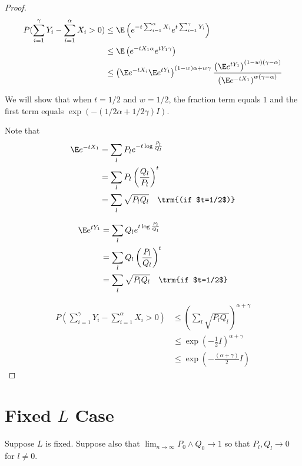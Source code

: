 \documentclass{article}
\begin{document}
\begin{proof}
\begin{align*}
P( \sum_{i=1}^\gamma Y_i - \sum_{i=1}^\alpha X_i > 0 ) &\leq 
  \E \left( e^{- t \sum_{i=1}^\alpha X_i} e^{t \sum_{i=1}^\gamma Y_i} \right) \\
 & \leq  \E \left( e^{ - t X_1 \alpha} e^{ t Y_1 \gamma} \right ) \\
 &\leq \left( \E e^{ - t X_i} \E e^{t Y_1} \right)^{(1-w)\alpha + w \gamma} 
       \frac{ \left( \E e^{t Y_1} \right)^{(1-w)(\gamma - \alpha)} }
            { \left( \E e^{-t X_1} \right)^{w (\gamma - \alpha)} }
\end{align*}

We will show that when $t=1/2$ and $w=1/2$, the fraction term equals $1$ and the first term equals $\exp\left( - (1/2 \alpha + 1/2 \gamma) I \right)$. 

Note that 
\begin{align*}
\E e^{ -t X_1} &= \sum_l P_l e^{ - t \log \frac{P_l}{Q_l}} \\
   &= \sum_l P_l \left( \frac{Q_l}{P_l} \right)^t \\ 
   &= \sum_l \sqrt{P_l Q_l} \quad \trm{(if $t=1/2$)}
\end{align*}

\begin{align*}
\E e^{ t Y_1} &= \sum_l Q_l e^{ t \log \frac{P_l}{Q_l} } \\
   &= \sum_l Q_l \left( \frac{P_l}{Q_l} \right)^t \\
   &= \sum_l \sqrt{P_l Q_l} \quad \trm{if $t=1/2$}
\end{align*}

\begin{align*}
P( \sum_{i=1}^\gamma Y_i - \sum_{i=1}^\alpha X_i > 0) &\leq 
    \left( \sum_l \sqrt{P_lQ_l} \right)^{\alpha + \gamma} \\
   &\leq  \exp( - \frac{1}{2} I)^{\alpha + \gamma} \\
   &\leq \exp\left( - \frac{(\alpha+\gamma)}{2}  I \right)
\end{align*}
   

\end{proof}





\section{Fixed $L$ Case}

Suppose $L$ is fixed. Suppose also that $\lim_{n\rightarrow \infty} P_0 \wedge Q_0 \rightarrow 1$ so that $P_l, Q_l \rightarrow 0$ for $l \neq 0$. 
\end{document}
